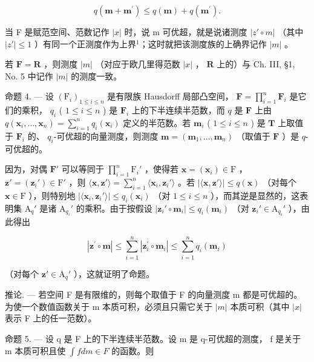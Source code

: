 \[
q (\mathbf {m} + \mathbf {m} ^ {\prime}) \leqslant q (\mathbf {m}) + q (\mathbf {m} ^ {\prime}).
\]

当 F 是赋范空间、范数记作 \(|x|\) 时，说 m 可优超，就是说诸测度 \(|z'\circ m|\) （其中 \(|z'| \leqslant 1\) ）有同一个正测度作为上界\(^{1}\)；这时就把该测度族的上确界记作 \(|m|\) 。

若 \(\mathbf{F} = \mathbf{R}\) ，则测度 \(|m|\) （对应于欧几里得范数 \(|x|\) ， \(\mathbf{R}\) 上的）与 Ch. III, §1, No. 5 中记作 \(|m|\) 的测度一致。

命题 4. --- 设 \((\mathrm{F}_i)_{1 \leqslant i \leqslant n}\) 是有限族 Hausdorff 局部凸空间， \(\mathbf{F} = \prod_{i=1}^{n} \mathbf{F}_i\) 是它们的乘积， \(q_i\) ( \(1 \leqslant i \leqslant n\) ) 是 \(\mathbf{F}_i\) 上的下半连续半范数，而 \(q\) 是 \(\mathbf{F}\) 上由 \(q(\mathbf{x}_i, \ldots, \mathbf{x}_n) = \sum_{i=1}^{n} q_i(\mathbf{x}_i)\) 定义的半范数。若 \(\mathbf{m}_i\) ( \(1 \leqslant i \leqslant n\) ) 是 \(\mathbf{T}\) 上取值于 \(\mathbf{F}_i\) 的、 \(q_i\)-可优超的向量测度，则测度 \(\mathbf{m} = (\mathbf{m}_1, \ldots, \mathbf{m}_n)\) （取值于 \(\mathbf{F}\) ）是 \(q\)-可优超的。

因为，对偶 \(\mathbf{F}'\) 可以等同于 \(\prod_{i=1}^{n} \mathrm{F}_i'\) ，使得若 \(\mathbf{x} = (\mathbf{x}_i) \in \mathrm{F}\) ， \(\mathbf{z}' = (\mathbf{z}_i') \in \mathrm{F}'\) ，则 \(\langle \mathbf{x}, \mathbf{z}' \rangle = \sum_{i=1}^{n} \langle \mathbf{x}_i, \mathbf{z}_i' \rangle\) 。若 \(|\langle \mathbf{x}, \mathbf{z}' \rangle| \leqslant q(\mathbf{x})\) （对每个 \(\mathbf{x} \in \mathrm{F}\) ），则特别地 \(|\langle \mathbf{x}_i, \mathbf{z}_i' \rangle| \leqslant q_i(\mathbf{x}_i)\) （对 \(1 \leqslant i \leqslant n\) ），而其逆是显然的，这表明集 \(\mathrm{A}_q'\) 是诸 \(\mathrm{A}_{q_i}'\) 的乘积。由于按假设 \(|\mathbf{z}_i' \circ \mathbf{m}_i| \leqslant q_i(\mathbf{m}_i)\) （对 \(\mathbf{z}_i' \in \mathrm{A}_{q_i}'\) ），由此得出

\[
\left| \mathbf {z} ^ {\prime} \circ \mathbf {m} \right| \leqslant \sum_ {i = 1} ^ {n} \left| \mathbf {z} _ {i} ^ {\prime} \circ \mathbf {m} _ {i} \right| \leqslant \sum_ {i = 1} ^ {n} q _ {i} (\mathbf {m} _ {i})
\]

（对每个 \(\mathbf{z}' \in \mathrm{A}_q'\) ），这就证明了命题。

推论. --- 若空间 F 是有限维的，则每个取值于 F 的向量测度 m 都是可优超的。为使一个数值函数关于 m 本质可积，必须且只需它关于 \(|m|\) 本质可积（其中 \(|x|\) 表示 F 上的任一范数）。

命题 5. --- 设 q 是 F 上的下半连续半范数。设 m 是 q-可优超的测度， f 是关于 m 本质可积且使 \(\int f dm \in F\) 的函数。则

